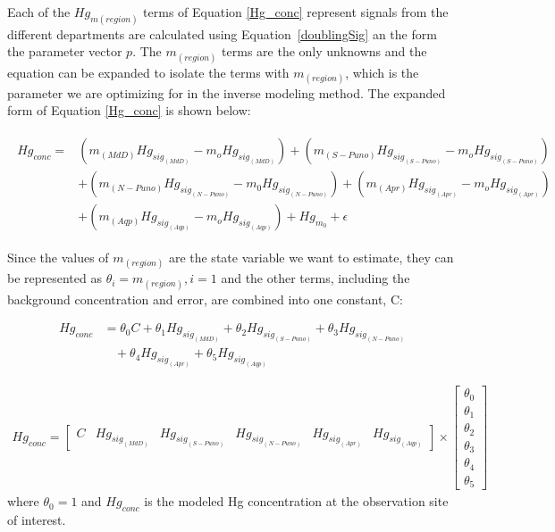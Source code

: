 \begin{flushleft}
Each of the $Hg_{m(region)}$ terms of Equation \ref{Hg_conc} represent signals from the different departments are calculated using Equation~\ref{doublingSig} an the form the parameter vector $p$. The $m_{(region)}$ terms are the only unknowns and the equation can be expanded to isolate the terms with $m_{(region)}$, which is the parameter we are optimizing for in the inverse modeling method. The expanded form of Equation \ref{Hg_conc} is shown below:

\begin{align}
\begin{split}\label{Hg_cons_expanded_form}
Hg_{conc}={}& (m_{(MdD)}Hg_{sig_{(MdD)}} -m_oHg_{sig_{(MdD)}})+ (m_{(S-Puno)}Hg_{sig_{(S-Puno)}} -m_oHg_{sig_{(S-Puno)}}) \\
            &+ (m_{(N-Puno)}Hg_{sig_{(N-Puno)}} -m_0Hg_{sig_{(N-Puno)}}) + (m_{(Apr)}Hg_{sig_{(Apr)}} -m_oHg_{sig_{(Apr)}}) \\
            &+ (m_{(Aqp)}Hg_{sig_{(Aqp)}} -m_oHg_{sig_{(Aqp)}})+Hg_{m_0} + \epsilon
\end{split}
\end{align}

Since the values of $m_{(region)}$ are the state variable we want to estimate, they can be represented as $\theta_i=m_{(region)}, i=1$ and the other terms, including the background concentration and error, are combined into one constant, C:

\begin{equation}
\begin{aligned}
    Hg_{conc}  & = \theta_0C  + \theta_1Hg_{sig_{(MdD)}}+ \theta_2Hg_{sig_{(S-Puno)}} +  \theta_3Hg_{sig_{(N-Puno)}} \\
                & \ \ \ \  +\theta_4Hg_{sig_{(Apr)}} +  \theta_5Hg_{sig_{(Aqp)}}
\end{aligned}
\end{equation}

\begin{align}
Hg_{conc} =\begin{bmatrix} C & Hg_{sig_{(MdD)}} & Hg_{sig_{(S-Puno)}} &Hg_{sig_{(N-Puno)}} &Hg_{sig_{(Apr)}} &Hg_{sig_{(Aqp)}}\end{bmatrix} \times 
            \begin{bmatrix} \theta_0 \\ \theta_1 \\ \theta_2\\ \theta_3\\ \theta_4\\ \theta_5  \end{bmatrix}
\end{align}
where $\theta_0=1$ and $Hg_{conc}$ is the modeled Hg concentration at the observation site of interest.
\end{flushleft}


